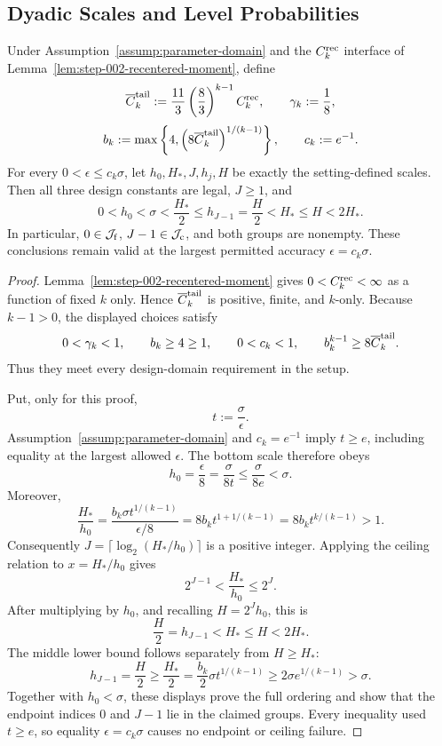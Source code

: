 \subsection{Dyadic Scales and Level Probabilities}\label{app:step-003}

\begin{lemma}\label{lem:step-003-scale-ordering}
Under Assumption~\ref{assump:parameter-domain} and the \(C_k^{\rm rec}\) interface of
Lemma~\ref{lem:step-002-recentered-moment}, define
\[
\overline C_k^{\rm tail}
:=\frac{11}{3}\left(\frac{8}{3}\right)^{k-1}C_k^{\rm rec},
\qquad
\gamma_k:=\frac18,
\]
\[
b_k:=\max\left\{4,
  \left(8\overline C_k^{\rm tail}\right)^{1/(k-1)}
\right\},
\qquad
c_k:=e^{-1}.
\]
For every \(0<\epsilon\leq c_k\sigma\), let \(h_0,H_*,J,h_j,H\)
be exactly the setting-defined scales. Then all three design constants are
legal, \(J\geq1\), and
\[
0<h_0<\sigma<\frac{H_*}{2}
\leq h_{J-1}=\frac H2
<H_*\leq H<2H_*.
\]
In particular, \(0\in\mathcal J_{\rm f}\),
\(J-1\in\mathcal J_{\rm c}\), and both groups are nonempty. These
conclusions remain valid at the largest permitted accuracy
\(\epsilon=c_k\sigma\).
\end{lemma}

\begin{proof}
Lemma~\ref{lem:step-002-recentered-moment} gives
\(0<C_k^{\rm rec}<\infty\) as a function of fixed \(k\) only. Hence
\(\overline C_k^{\rm tail}\) is positive, finite, and \(k\)-only. Because
\(k-1>0\), the displayed choices satisfy
\[
0<\gamma_k<1,
\qquad b_k\geq4\geq1,
\qquad 0<c_k<1,
\qquad
b_k^{k-1}\geq8\overline C_k^{\rm tail}.
\]
Thus they meet every design-domain requirement in the setup.

Put, only for this proof,
\[
t:=\frac{\sigma}{\epsilon}.
\]
Assumption~\ref{assump:parameter-domain} and \(c_k=e^{-1}\) imply
\(t\geq e\), including equality at the largest allowed \(\epsilon\). The
bottom scale therefore obeys
\[
h_0=\frac{\epsilon}{8}=\frac{\sigma}{8t}
\leq\frac{\sigma}{8e}<\sigma.
\]
Moreover,
\[
\frac{H_*}{h_0}
=\frac{b_k\sigma t^{1/(k-1)}}{\epsilon/8}
=8b_k t^{1+1/(k-1)}
=8b_k t^{k/(k-1)}>1.
\]
Consequently \(J=\lceil\log_2(H_*/h_0)\rceil\) is a positive integer.
Applying the ceiling relation to \(x=H_*/h_0\) gives
\[
2^{J-1}<\frac{H_*}{h_0}\leq2^J.
\]
After multiplying by \(h_0\), and recalling \(H=2^Jh_0\), this is
\[
\frac H2=h_{J-1}<H_*\leq H<2H_*.
\]
The middle lower bound follows separately from \(H\geq H_*\):
\[
h_{J-1}=\frac H2\geq\frac{H_*}{2}
=\frac{b_k}{2}\sigma t^{1/(k-1)}
\geq2\sigma e^{1/(k-1)}>\sigma.
\]
Together with \(h_0<\sigma\), these displays prove the full ordering and
show that the endpoint indices \(0\) and \(J-1\) lie in the claimed groups.
Every inequality used \(t\geq e\), so equality
\(\epsilon=c_k\sigma\) causes no endpoint or ceiling failure.
\end{proof}

